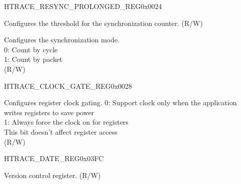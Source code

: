 \begin{register}{H}{TRACE\_RESYNC\_PROLONGED\_REG}{0x0024}\label{regdesc:TRACERESYNCPROLONGEDREG}
%
%
%
\regnewline%
\begin{regdesc}\begin{reglist}
\label{fielddesc:TRACERESYNCPROLONGED}\item [TRACE\_RESYNC\_PROLONGED] Configures the threshold for the synchronization counter. (R/W)
\label{fielddesc:TRACERESYNCMODE}\item [TRACE\_RESYNC\_MODE] Configures the synchronization mode.\\
0: Count by cycle\\
1: Count by packet\\ (R/W)
\end{reglist}\end{regdesc}
\end{register}


\begin{register}{H}{TRACE\_CLOCK\_GATE\_REG}{0x0028}\label{regdesc:TRACECLOCKGATEREG}
%
%
\regnewline%
\begin{regdesc}\begin{reglist}
\label{fielddesc:TRACECLKEN}\item [TRACE\_CLK\_EN] Configures register clock gating.
0: Support clock only when the application writes registers to save power\\ 
1: Always force the clock on for registers\\
 This bit doesn't affect register access\\(R/W)
\end{reglist}\end{regdesc}
\end{register}


\begin{register}{H}{TRACE\_DATE\_REG}{0x03FC}\label{regdesc:TRACEDATEREG}
%
%
\regnewline%
\begin{regdesc}\begin{reglist}
\label{fielddesc:TRACEDATE}\item [TRACE\_DATE] Version control register. (R/W)
\end{reglist}\end{regdesc}
\end{register}


